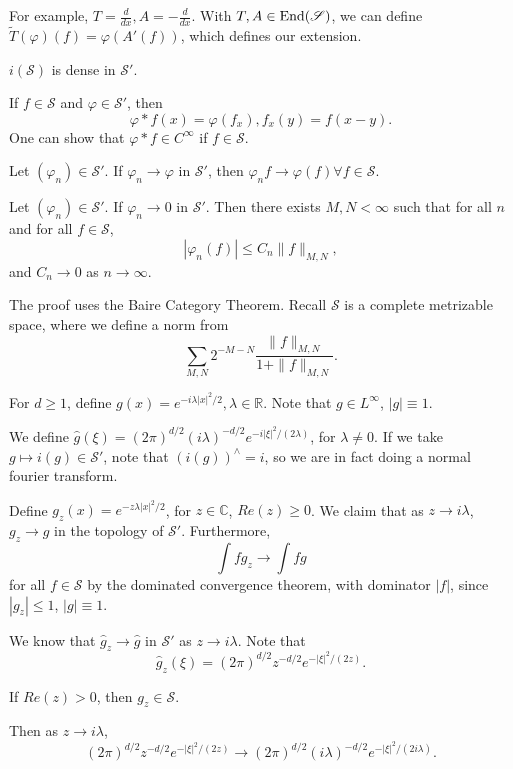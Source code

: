 \documentclass[11pt]{scrartcl}
\newcommand{\R}{\mathbb{R}}
\newcommand{\C}{\mathbb C}
\newcommand{\SRS}{\mathscr {S}}
\let \phi \varphi
\let \hat \widehat
\newcommand{\<}{\langle}
\renewcommand{\>}{\rangle}
\begin{document}
For example, $T = \frac{d}{dx}, A = -\frac{d}{dx}.$  With $T, A \in \operatorname{End}(\mathscr S)$, we can define $\tilde{T}(\phi)(f) = \phi(A'(f))$, which defines our extension.
\begin{proposition} $i(\mathscr S)$ is dense in $\mathscr S'$.
\end{proposition}
\begin{definition} If $f \in \mathscr S$ and $\phi \in \mathscr S'$, then
$$\phi * f(x) = \phi(f_x), f_x(y) = f(x-y).$$
One can show that $\phi * f \in C^{\infty}$ if $f \in \mathscr{S}$. 
\end{definition}
\begin{proposition} Let $(\phi_n) \in \mathscr S'$.  If $\phi_n \rightarrow \phi$ in $\mathscr S'$, then 
$\phi_n f \rightarrow \phi(f) \forall f \in \mathscr S$.
\end{proposition}
\begin{proposition} Let $(\phi_n) \in \mathscr S'$.  If $\phi_n \rightarrow 0$ in $\mathscr S'$.  Then there exists $M, N < \infty$ such that for all $n$ and for all $f \in \mathscr S$, 
$$|\phi_n(f)| \le C_n \|f\|_{M, N},$$
and $C_n \rightarrow 0$ as $n \rightarrow \infty$.
\end{proposition}
The proof uses the Baire Category Theorem.  Recall $\mathscr S$ is a complete metrizable space, where we define a norm from
$$\sum_{M, N} 2^{-M-N} \frac{\|f\|_{M, N}}{1 + \|f\|_{M, N}}.$$

For $d \ge 1$, define $g(x) = e^{-i\lambda |x|^2/2}, \lambda \in \R$.  Note that $g \in L^{\infty}$, $|g| \equiv 1$.  

We define $\hat{g}(\xi) = (2\pi)^{d/2}(i\lambda)^{-d/2}e^{-i|\xi|^2/(2\lambda)}$, for $\lambda \ne 0$.  If we take $g \mapsto i(g) \in \SRS '$, note that $(i(g))^{\wedge} = i$, so we are in fact doing a normal fourier transform.


Define $g_z(x) = e^{-z\lambda |x|^2/2}$, for $z \in \C$, $Re(z) \ge 0$.  We claim that as $z \rightarrow i\lambda$, $g_z \rightarrow g$ in the topology of $\SRS '$.  Furthermore,
$$\int fg_z \rightarrow \int fg$$
for all $f \in \SRS$ by the dominated convergence theorem, with dominator $|f|$, since $|g_z| \le 1$, $|g| \equiv 1$.

We know that $\hat{g}_z \rightarrow \hat{g}$ in $\SRS'$ as $z \rightarrow i\lambda$.  Note that 
$$\hat{g}_z(\xi) = (2\pi)^{d/2} z^{-d/2}e^{-|\xi|^2/(2z)}.$$

If $Re(z) > 0$, then $g_z \in \SRS$.

Then as $z \rightarrow i \lambda$,
$$(2\pi)^{d/2} z^{-d/2}e^{-|\xi|^2/(2z)} \rightarrow (2\pi)^{d/2}(i\lambda)^{-d/2}e^{-|\xi|^2/(2i\lambda)}.$$
\end{document}
